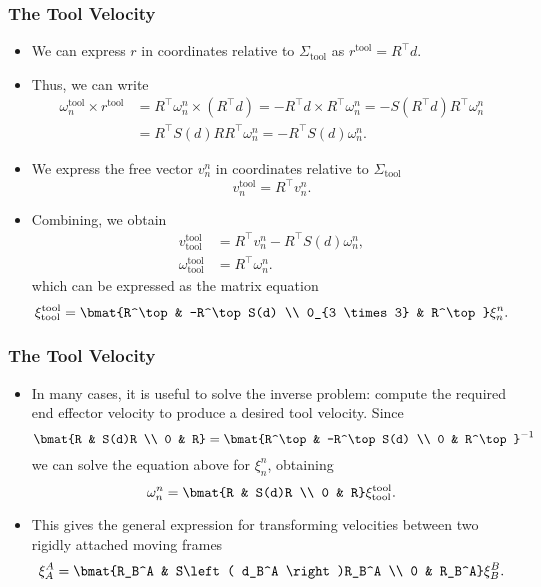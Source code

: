 \begin{frame}
    \frametitle{The Tool Velocity}

    \begin{itemize}
        \item We can express $r$ in coordinates relative to
        $\Sigma_{\textrm{tool}}$ as $r^{\textrm{tool}} = R^\top d$.
        \item Thus, we can write 
        \begin{align*}
            \omega_n^{\textrm{tool}} \times r^{\textrm{tool}} &= 
            R^\top \omega_n^n \times \left( R^\top d \right) = -R^\top d \times 
            R^\top \omega_n^n = -S\left( R^\top d \right)R^\top \omega_n^n \\
            &= R^\top S(d) RR^\top \omega_n^n = -R^\top S(d) \omega_n^n.
        \end{align*}
        \item We express the free vector $v_n^n$ in coordinates relative to
        $\Sigma_{\textrm{tool}}$ \[v_n^{\textrm{tool}} = R^\top v_n^n. \]
        \item Combining, we obtain
        \begin{align*}
            v_{\textrm{tool}}^{\textrm{tool}} &= R^\top v_n^n - R^\top S(d) \omega_n^n, \\
            \omega_{\textrm{tool}}^{\textrm{tool}} &= R^\top \omega_n^n.
        \end{align*}
        which can be expressed as the matrix equation
        \[
        \xi_{\textrm{tool}}^{\textrm{tool}} = \bmat{R^\top & -R^\top S(d) \\ 0_{3 \times 3} & R^\top}\xi_n^n.
        \]
    \end{itemize}
\end{frame}


\begin{frame}
    \frametitle{The Tool Velocity}

    \begin{itemize}
        \item In many cases, it is useful to solve the inverse problem: compute
        the required end effector velocity to produce a desired tool velocity.
        Since 
        \[
        \bmat{R & S(d)R \\ 0 & R} = \bmat{R^\top & -R^\top S(d) \\ 0 & R^\top}^{-1}
        \]
        we can solve the equation above for $\xi_n^n$, obtaining
        \[ \omega_n^n = \bmat{R & S(d)R \\ 0 & R}\xi_{\textrm{tool}}^{\textrm{tool}}. \]
        \item This gives the general expression for transforming velocities
        between two rigidly attached moving frames
        \[
        \xi_A^A = \bmat{R_B^A & S\left( d_B^A \right)R_B^A \\ 0 & R_B^A}\xi_B^B.
        \]
    \end{itemize}
\end{frame}


\endgroup